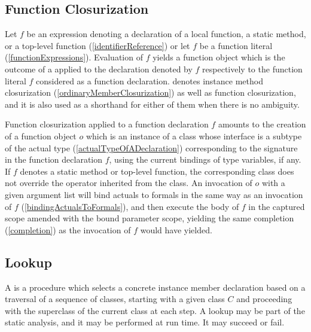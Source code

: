 \documentclass[makeidx]{article}
\begin{document}
\subsection{Function Closurization}

\LMHash{}%
Let $f$ be an expression denoting
a declaration of a local function, a static method, or a top-level function
(\ref{identifierReference})
or let $f$ be a function literal
(\ref{functionExpressions}).
Evaluation of $f$ yields a function object
which is the outcome of a 
applied to the declaration denoted by $f$
respectively to the function literal $f$ considered as a function declaration.
denotes instance method closurization
(\ref{ordinaryMemberClosurization})
as well as function closurization,
and it is also used as a shorthand for either of them when there is no ambiguity.

\LMHash{}%
Function closurization applied to a function declaration $f$
amounts to the creation of a function object $o$
which is an instance of a class whose interface is a subtype of the actual type
(\ref{actualTypeOfADeclaration})
corresponding to the signature in the function declaration $f$,
using the current bindings of type variables, if any.
If $f$ denotes a static method or top-level function,
the corresponding class does not override the \code{==} operator
inherited from the  class.
%
An invocation of $o$ with a given argument list will bind actuals to formals
in the same way as an invocation of $f$
(\ref{bindingActualsToFormals}),
and then execute the body of $f$
in the captured scope amended with the bound parameter scope,
yielding the same completion
(\ref{completion})
as the invocation of $f$ would have yielded.


\subsection{Lookup}

\LMHash{}%
A  is a procedure which selects
a concrete instance member declaration based on a traversal of
a sequence of classes, starting with a given class $C$
and proceeding with the superclass of the current class at each step.
A lookup may be part of the static analysis, and it may be performed
at run time. It may succeed or fail.
\end{document}
